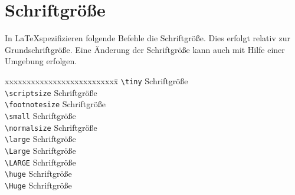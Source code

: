 \section{Schriftgröße}
In \LaTeX spezifizieren folgende Befehle die Schriftgröße. Dies erfolgt relativ zur Grundschriftgröße. Eine Änderung der Schriftgröße kann auch mit Hilfe einer Umgebung erfolgen.
\begin{tabbing}
xxxxxxxxxxxxxxxxxxxxxxxxxx\=\kill
\verb=\tiny=			\>\tiny{Schriftgröße}\\
\verb=\scriptsize=		\>\scriptsize{Schriftgröße}\\
\verb=\footnotesize=		\>\footnotesize{Schriftgröße}\\
\verb=\small=			\>\small{Schriftgröße}\\
\verb=\normalsize=		\>\normalsize{Schriftgröße}\\
\verb=\large=			\>\large{Schriftgröße}\\[3pt]
\verb=\Large=			\>\Large{Schriftgröße}\\[3pt]
\verb=\LARGE=			\>\LARGE{Schriftgröße}\\[3pt]
\verb=\huge=			\>\huge{Schriftgröße}\\[3pt]
\verb=\Huge=			\>\Huge{Schriftgröße}\\[3pt]
\end{tabbing}
